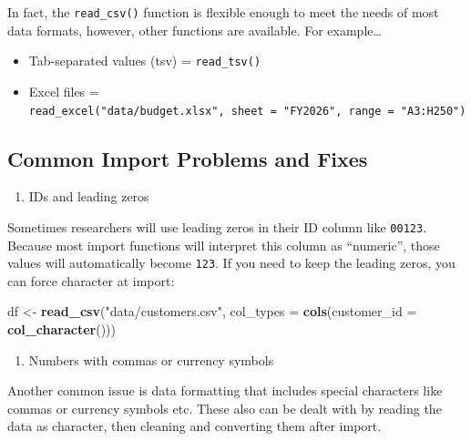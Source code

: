 \documentclass[
  11pt,
]{article}
\newenvironment{Shaded}{\begin{snugshade}}{\end{snugshade}}
\newcommand{\AttributeTok}[1]{\textcolor[rgb]{0.13,0.29,0.53}{#1}}
\newcommand{\FunctionTok}[1]{\textcolor[rgb]{0.13,0.29,0.53}{\textbf{#1}}}
\newcommand{\NormalTok}[1]{#1}
\newcommand{\OtherTok}[1]{\textcolor[rgb]{0.56,0.35,0.01}{#1}}
\newcommand{\StringTok}[1]{\textcolor[rgb]{0.31,0.60,0.02}{#1}}
\providecommand{\tightlist}{%
  \setlength{\itemsep}{0pt}\setlength{\parskip}{0pt}}
\begin{document}
In fact, the \texttt{read\_csv()} function is flexible enough to meet
the needs of most data formats, however, other functions are available.
For example\ldots{}

\begin{itemize}
\tightlist
\item
  Tab-separated values (tsv) = \texttt{read\_tsv()}
\item
  Excel files =
  \texttt{read\_excel("data/budget.xlsx",\ sheet\ =\ "FY2026",\ range\ =\ "A3:H250")}
\end{itemize}

\subsection{Common Import Problems and
Fixes}\label{common-import-problems-and-fixes}

\begin{enumerate}
\def\labelenumi{\arabic{enumi}.}
\tightlist
\item
  IDs and leading zeros
\end{enumerate}

Sometimes researchers will use leading zeros in their ID column like
\texttt{00123}. Because most import functions will interpret this column
as ``numeric'', those values will automatically become \texttt{123}. If
you need to keep the leading zeros, you can force character at import:

\begin{Shaded}
\begin{Highlighting}[]
\NormalTok{df }\OtherTok{\textless{}{-}} \FunctionTok{read\_csv}\NormalTok{(}\StringTok{"data/customers.csv"}\NormalTok{, }\AttributeTok{col\_types =} \FunctionTok{cols}\NormalTok{(}\AttributeTok{customer\_id =} \FunctionTok{col\_character}\NormalTok{()))}
\end{Highlighting}
\end{Shaded}

\begin{enumerate}
\def\labelenumi{\arabic{enumi}.}
\setcounter{enumi}{1}
\tightlist
\item
  Numbers with commas or currency symbols
\end{enumerate}

Another common issue is data formatting that includes special characters
like commas or currency symbols etc. These also can be dealt with by
reading the data as character, then cleaning and converting them after
import.
\end{document}
